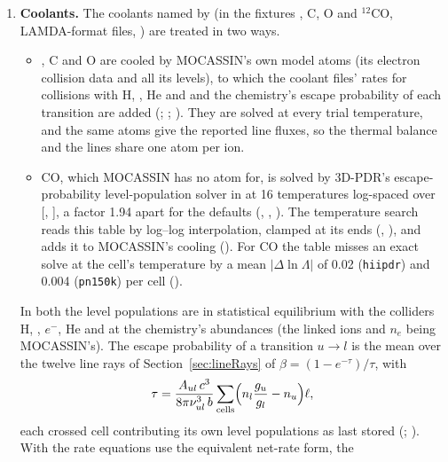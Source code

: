 \begin{enumerate}
\item \textbf{Coolants.} The coolants named by  (in the
  fixtures \Cp, C, O and $^{12}$CO, LAMDA-format files, \citealt{Schoier2005})
  are treated in two ways.
  \begin{itemize}
  \item \Cp, C and O are cooled by MOCASSIN's own model atoms (its electron
    collision data and all its levels), to which the coolant files' rates for
    collisions with H, \Hp, He and \Htwo{} and the chemistry's escape
    probability of each transition are added (;
    ; ). They are solved at every
    trial temperature, and the same atoms give the reported line fluxes, so
    the thermal balance and the lines share one atom per ion.
  \item CO, which MOCASSIN has no atom for, is solved by 3D-PDR's
    escape-probability level-population solver in  at 16
    temperatures log-spaced over [, ], a factor 1.94
    apart for the defaults (,
    , ). The temperature search reads
    this table by log--log interpolation, clamped at its ends (,
    ), and adds it to MOCASSIN's cooling
    (). For CO the table misses an exact solve
    at the cell's temperature by a mean $|\Delta\ln\Lambda|$ of 0.02
    (\texttt{hiipdr}) and 0.004 (\texttt{pn150k}) per cell ().
  \end{itemize}
  In both the level populations are in statistical equilibrium with the
  colliders H, \Hp, $e^-$, He and \Htwo{} at the chemistry's abundances (the
  linked ions and $n_e$ being MOCASSIN's). The escape probability of a
  transition $u\to l$ is the mean over the twelve line rays of
  Section~\ref{sec:lineRays} of $\beta=(1-e^{-\tau})/\tau$, with
  \begin{equation}
    \tau = \frac{A_{ul}\,c^3}{8\pi\nu_{ul}^3\,b}\sum_{\mathrm{cells}}
           \Bigl(n_l\frac{g_u}{g_l}-n_u\Bigr)\ell ,
  \end{equation}
  each crossed cell contributing its own level populations as last stored
  (; ). With
   the rate equations use the equivalent net-rate form, the

\end{enumerate}
